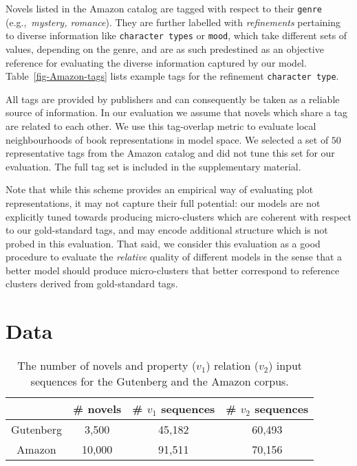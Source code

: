 \documentclass[11pt,letterpaper]{article}
\begin{document}
Novels listed in the Amazon catalog are tagged with respect to their {\tt genre} (e.g.,~{\it mystery, romance}). They are further labelled with {\it refinements} pertaining to diverse information like {\tt character types} or {\tt mood}, which take different sets of values, depending on the genre, and are as such predestined as an objective reference for evaluating the diverse information captured by our model. Table~\ref{fig-Amazon-tags} lists example tags for the refinement {\tt character type}.

All tags are provided by publishers and can consequently be taken as a reliable source of information. In our evaluation we assume that novels which share a tag are related to each other. We use this tag-overlap metric to evaluate local neighbourhoods of book representations in model space. We selected a set of $50$ representative tags from the Amazon catalog and did not tune this set for our evaluation. The full tag set is included in the supplementary material.

Note that while this scheme provides an empirical way of evaluating plot representations, it may not capture their full potential: our models are not explicitly tuned towards producing micro-clusters which are coherent with respect to our gold-standard tags, and may encode additional structure which is not probed in this evaluation. 
That said, we consider this evaluation as a good procedure to evaluate the {\it relative} quality of different models in the sense that a better model should produce micro-clusters that better correspond to reference clusters derived from gold-standard tags.

\section{Data}
\label{sec-data}
\begin{table}
\small{\begin{tabular}{cccc}
 \hline
 &\# novels & \# $v_1$ sequences & \# $v_2$ sequences\\\hline
 Gutenberg&3,500&45,182&60,493\\
 Amazon&10,000&91,511&70,156\\\hline
\end{tabular}}
 \caption{The number of novels and property (${v_1}$) relation (${v_2}$) input sequences for the Gutenberg and the Amazon corpus.}
 \label{tab-data sets}
\end{table}
\end{document}

